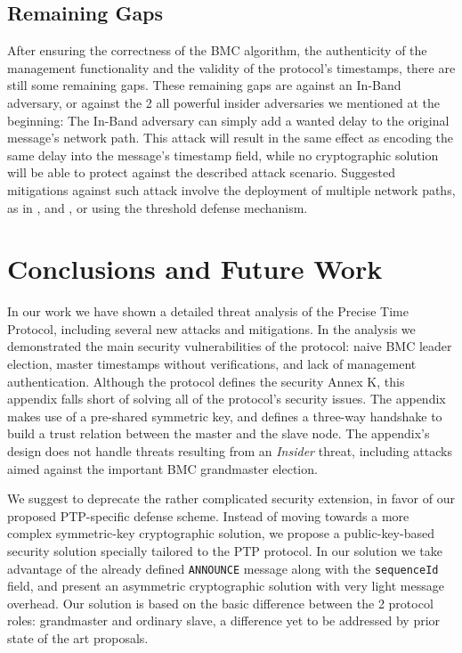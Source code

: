 \documentclass[11pt]{article}
\begin{document}
\subsection{Remaining Gaps}\label{sol:gaps}

After ensuring the correctness of the BMC algorithm, the authenticity of the management functionality and the validity of the protocol's timestamps, there are still some remaining gaps. These remaining gaps are against an In-Band adversary, or against the 2 all powerful insider adversaries we mentioned at the beginning: The In-Band adversary can simply add a wanted delay to the original message's network path. This attack will result in the same effect as encoding the same delay into the message's timestamp field, while no cryptographic solution will be able to protect against the described attack scenario. Suggested mitigations against such attack involve the deployment of multiple network paths, as in \cite{duplicate_PTP}, \cite{multiple_paths} and \cite{byzantine}, or using the threshold defense mechanism.







\section{Conclusions and Future Work}\label{Conclusions}

In our work we have shown a detailed threat analysis of the Precise Time Protocol, including several new attacks and mitigations. In the analysis we demonstrated the main security vulnerabilities of the protocol: naive BMC leader election, master timestamps without verifications, and lack of management authentication. Although the protocol defines the security Annex K, this appendix falls short of solving all of the protocol's security issues. The appendix makes use of a pre-shared symmetric key, and defines a three-way handshake to build a trust relation between the master and the slave node. The appendix's design does not handle threats resulting from an \emph{Insider} threat, including attacks aimed against the important BMC grandmaster election.



We suggest to deprecate the rather complicated security extension, in favor of our proposed PTP-specific defense scheme. Instead of moving towards a more complex symmetric-key cryptographic solution, we propose a public-key-based security solution specially tailored to the PTP protocol. In our solution we take advantage of the already defined \texttt{ANNOUNCE} message along with the \texttt{sequenceId} field, and present an asymmetric cryptographic solution with very light message overhead. Our solution is based on the basic difference between the 2 protocol roles: grandmaster and ordinary slave, a difference yet to be addressed by prior state of the art proposals.
\end{document}
